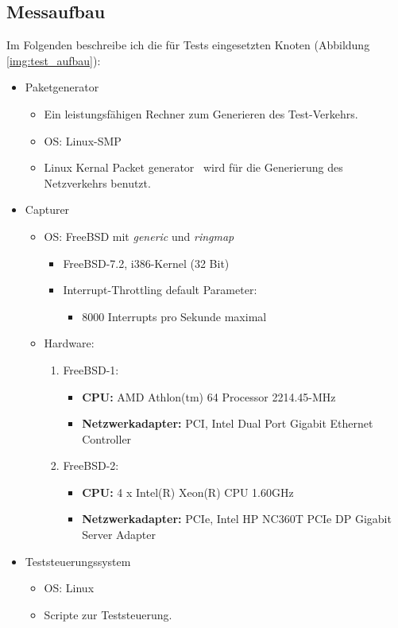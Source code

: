 \subsection{Messaufbau}\label{sec:messaufbau}
Im Folgenden beschreibe ich die für Tests eingesetzten Knoten (Abbildung
\ref{img:test_aufbau}): 
\begin{itemize}
	\item Paketgenerator
		\begin{itemize}
			\item Ein leistungsfähigen Rechner zum Generieren des Test-Verkehrs.
			\item OS: Linux-SMP
			\item Linux Kernal Packet generator~\cite{linux_pktgen} wird für
				die Generierung des Netzverkehrs benutzt.
		\end{itemize}
	\item Capturer
		\begin{itemize}
			\item OS: FreeBSD mit \emph{generic} und \emph{ringmap}
				\begin{itemize}
					\item FreeBSD-7.2, i386-Kernel (32 Bit)
					\item Interrupt-Throttling default Parameter:
						\begin{itemize}
							\item 8000 Interrupts pro Sekunde maximal
						\end{itemize}
				\end{itemize}
			\item Hardware:
				\begin{enumerate}
					\item FreeBSD-1:
						\begin{itemize}
							\item \textbf{CPU:} AMD Athlon(tm) 64 Processor 2214.45-MHz
							\item \textbf{Netzwerkadapter:} PCI, Intel Dual Port Gigabit Ethernet Controller
						\end{itemize}
					\item FreeBSD-2:
						\begin{itemize}
							\item \textbf{CPU:} 4 x Intel(R) Xeon(R) CPU 1.60GHz
							\item \textbf{Netzwerkadapter:} PCIe, Intel HP NC360T PCIe DP Gigabit Server Adapter	 
						\end{itemize}
				\end{enumerate}
						\end{itemize}
	\item Teststeuerungssystem
		\begin{itemize}
			\item OS: Linux
			\item Scripte zur Teststeuerung.
		\end{itemize}
\end{itemize}
